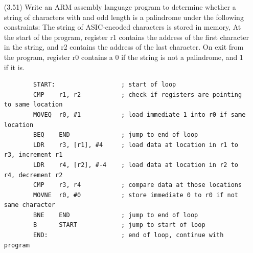 \documentclass[letterpaper,10pt,titlepage]{article}
\begin{document}
\begin{enumerate}
	\item[(3.51)] Write an ARM assembly language program to determine whether a string
		of characters with and odd length is a palindrome under the following
		constraints: The string of ASIC-encoded characters is stored in memory, At
		the start of the program, register r1 contains the address of the first
		character in the string, and r2 contains the address of the last
		character. On exit from the program, register r0 contains a 0 if the
		string is not a palindrome, and 1 if it is.
		\\
		\begin{verbatim}
		START:                  ; start of loop
		CMP    r1, r2           ; check if registers are pointing to same location
		MOVEQ  r0, #1           ; load immediate 1 into r0 if same location
		BEQ    END              ; jump to end of loop
		LDR    r3, [r1], #4     ; load data at location in r1 to r3, increment r1
		LDR    r4, [r2], #-4    ; load data at location in r2 to r4, decrement r2
		CMP    r3, r4           ; compare data at those locations
		MOVNE  r0, #0           ; store immediate 0 to r0 if not same character
		BNE    END              ; jump to end of loop
		B      START            ; jump to start of loop
		END:                    ; end of loop, continue with program
		\end{verbatim}

\end{enumerate}
\end{document}
